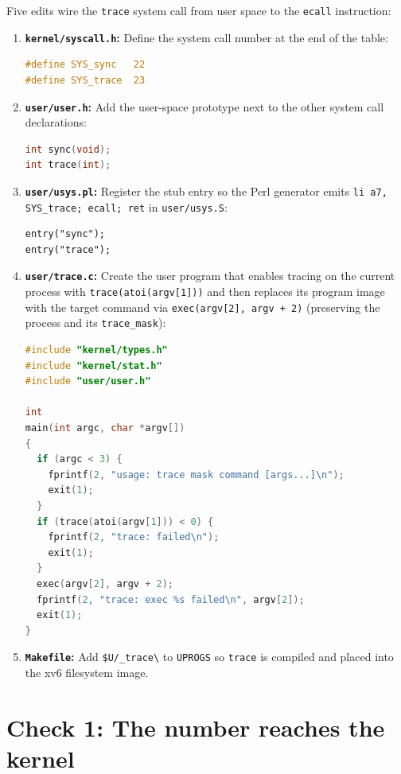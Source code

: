 \documentclass{../latex/utmreport}
\providecommand{\tightlist}{\setlength{\itemsep}{0pt}\setlength{\parskip}{0pt}}
\begin{document}
Five edits wire the \texttt{trace} system call from user space to the \texttt{ecall} instruction:

\begin{enumerate}
\tightlist
\item \textbf{\texttt{kernel/syscall.h}:} Define the system call number at the end of the table:
\begin{lstlisting}[language=C]
#define SYS_sync   22
#define SYS_trace  23
\end{lstlisting}

\item \textbf{\texttt{user/user.h}:} Add the user-space prototype next to the other system call declarations:
\begin{lstlisting}[language=C]
int sync(void);
int trace(int);
\end{lstlisting}

\item \textbf{\texttt{user/usys.pl}:} Register the stub entry so the Perl generator emits \texttt{li a7, SYS\_trace; ecall; ret} in \texttt{user/usys.S}:
\begin{lstlisting}
entry("sync");
entry("trace");
\end{lstlisting}

\item \textbf{\texttt{user/trace.c}:} Create the user program that enables tracing on the current process with \texttt{trace(atoi(argv[1]))} and then replaces its program image with the target command via \texttt{exec(argv[2], argv + 2)} (preserving the process and its \texttt{trace\_mask}):
\begin{lstlisting}[language=C]
#include "kernel/types.h"
#include "kernel/stat.h"
#include "user/user.h"

int
main(int argc, char *argv[])
{
  if (argc < 3) {
    fprintf(2, "usage: trace mask command [args...]\n");
    exit(1);
  }
  if (trace(atoi(argv[1])) < 0) {
    fprintf(2, "trace: failed\n");
    exit(1);
  }
  exec(argv[2], argv + 2);
  fprintf(2, "trace: exec %s failed\n", argv[2]);
  exit(1);
}
\end{lstlisting}

\item \textbf{\texttt{Makefile}:} Add \texttt{\$U/\_trace\textbackslash} to \texttt{UPROGS} so \texttt{trace} is compiled and placed into the xv6 filesystem image.
\end{enumerate}

\section{Check 1: The number reaches the kernel}
\end{document}
